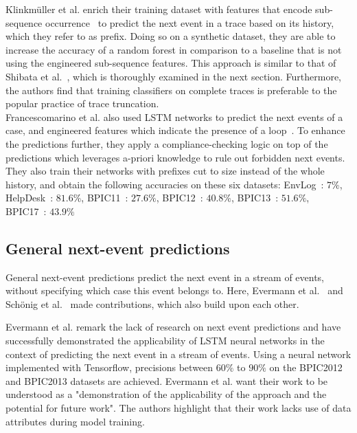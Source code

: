 Klinkmüller et al. enrich their training dataset with features that encode sub-sequence occurrence~\cite{klinkmuller2018reliablemonitoring} to predict the next event in a trace based on its history, which they refer to as prefix. Doing so on a synthetic dataset, they are able to increase the accuracy of a random forest in comparison to a baseline that is not using the engineered sub-sequence features. This approach is similar to that of Shibata et al.~\cite{shibata2016bipartite}, which is thoroughly examined in the next section. Furthermore, the authors find that training classifiers on complete traces is preferable to the popular practice of trace truncation.\\

Francescomarino et al. also used LSTM networks to predict the next events of a case, and engineered features which indicate the presence of a loop~\cite{francescomarino2017}. To enhance the predictions further, they apply a compliance-checking logic on top of the predictions which leverages a-priori knowledge to rule out forbidden next events. They also train their networks with prefixes cut to size instead of the whole history, and obtain the following accuracies on these six datasets:
EnvLog~\cite{EnvLog}: $7\%$, HelpDesk~\cite{Helpdesk}: $81.6\%$, BPIC11~\cite{BPIC2011}: $27.6\%$, BPIC12~\cite{BPIC2012}: $40.8\%$, BPIC13~\cite{BPIC2013}: $51.6\%$, BPIC17~\cite{BPIC2017}: $43.9\%$

\subsection*{General next-event predictions}
General next-event predictions predict the next event in a stream of events, without specifying which case this event belongs to. Here, Evermann et al.~\cite{evermann2016} and Schönig et al.~\cite{schoenig2018} made contributions, which also build upon each other.

Evermann et al. remark the lack of research on next event predictions and have successfully demonstrated the applicability of LSTM neural networks in the context of predicting the next event in a stream of events. Using a neural network implemented with Tensorflow, precisions between $60\%$ to $90\%$ on the BPIC2012 and BPIC2013 datasets are achieved. Evermann et al. want their work to be understood as a "demonstration of the applicability of the approach and the potential for future work". The authors highlight that their work lacks use of data attributes during model training.

